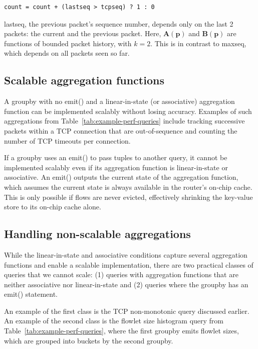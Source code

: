 \begin{lstlisting}
count = count + (lastseq > tcpseq) ? 1 : 0
\end{lstlisting}

{\ct lastseq}, the previous packet's sequence number,
depends only on the last 2 packets: the current and the previous packet. Here,
$\boldsymbol{A}(\mathbf{p})$ and $\boldsymbol{B}(\mathbf{p})$ are functions of
bounded packet history, with $k = 2$. This is in contrast to {\ct maxseq},
which depends on all packets seen so far.

\subsection{Scalable aggregation functions}
\label{sec:scalable}
A {\ct groupby} with no {\ct emit()} and a linear-in-state (or associative)
aggregation function can be implemented scalably without losing accuracy.
Examples of such aggregations from Table~\ref{tab:example-perf-queries}
include tracking successive packets within a TCP connection that are
out-of-sequence and counting the number of TCP timeouts per connection.

 If a {\ct groupby} uses an {\ct emit()} to pass tuples to another query, it
cannot be implemented scalably even if its aggregation function is
linear-in-state or associative. An {\ct emit()} outputs the current state of
the aggregation function, which assumes the current state is always available
in the router's on-chip cache. This is only possible if flows are never
evicted, effectively shrinking the key-value store to its on-chip cache alone.

\subsection{Handling non-scalable aggregations}
\label{sec:workaround-nonscalable}
While the linear-in-state and associative conditions capture several
aggregation functions and enable a scalable implementation, there are two
practical classes of queries that we cannot scale: (1) queries with aggregation
functions that are neither associative nor linear-in-state and (2) queries
where the groupby has an {\ct emit()} statement.

An example of the first class is the TCP non-monotonic query discussed earlier.
An example of the second class is the flowlet size histogram query from
Table~\ref{tab:example-perf-queries}, where the first {\ct groupby} emits
flowlet sizes, which are grouped into buckets by the second {\ct groupby}.

